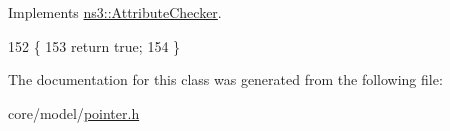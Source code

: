 Implements \hyperlink{classns3_1_1AttributeChecker_a6e8d7ecc2e7d133904a537216a33ab4c}{ns3\+::\+Attribute\+Checker}.


\begin{DoxyCode}
152                                                          \{
153     \textcolor{keywordflow}{return} \textcolor{keyword}{true};
154   \}
\end{DoxyCode}


The documentation for this class was generated from the following file\+:\begin{DoxyCompactItemize}
\item 
core/model/\hyperlink{pointer_8h}{pointer.\+h}\end{DoxyCompactItemize}

